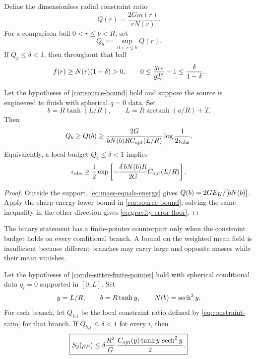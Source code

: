 Define the dimensionless radial constraint ratio
\begin{equation}
 Q(r)=\frac{2Gm(r)}{rN(r)}.
 \label{eq:constraint-ratio}
\end{equation}
For a comparison ball $0<r\leq b<R$, set
\begin{equation}
 Q_b:=\sup_{0<r\leq b}Q(r).
\end{equation}
If $Q_b\leq\delta<1$, then throughout that ball
\begin{equation}
 f(r)\geq N(r)(1-\delta)>0,
 \qquad
 0\leq\frac{g_{rr}}{g_{rr}^{\rm dS}}-1
 \leq\frac{\delta}{1-\delta}.
 \label{eq:metric-control}
\end{equation}

\begin{corollary}
\label{cor:gravity-cost}
Let the hypotheses of \cref{cor:source-bound} hold and suppose the source is
engineered to finish with spherical $q=0$ data.  Set
\begin{equation}
 b=R\tanh(L/R),
 \qquad L=R\operatorname{arctanh}(a/R)+T.
\end{equation}
Then
\begin{equation}
 Q_b\geq Q(b)
 \geq
 \frac{2G}{bN(b)R C_{\rm opt}(L/R)}
 \log\frac{1}{2\epsilon_{\mathrm{obs}}}.
 \label{eq:gravity-lower-bound}
\end{equation}
Equivalently, a local budget $Q_b\leq\delta<1$ implies
\begin{equation}
 \epsilon_{\mathrm{obs}}\geq\frac12\exp\left[
 -\frac{\delta\,bN(b)R}{2G}C_{\rm opt}(L/R)
 \right].
 \label{eq:gravity-error-floor}
\end{equation}
\end{corollary}

\begin{proof}
Outside the support, \cref{eq:mass-equals-energy} gives
$Q(b)=2GE_{K}/[bN(b)]$.  Apply the sharp energy lower bound in
\cref{cor:source-bound}; solving the same inequality in the other direction
gives \cref{eq:gravity-error-floor}.
\end{proof}

The binary statement has a finite-pointer counterpart only when the
constraint budget holds on every conditional branch.  A bound on the weighted
mean field is insufficient because different branches may carry large and
opposite masses while their mean vanishes.

\begin{corollary}
\label{cor:branchwise-gravity-renyi}
Let the hypotheses of \cref{cor:de-sitter-finite-pointer} hold with spherical
conditional data $q_i=0$ supported in $[0,L]$.  Set
\begin{equation}
 y=L/R,
 \qquad b=R\tanh y,
 \qquad N(b)=\operatorname{sech}^2y.
\end{equation}
For each branch, let $Q_{b,i}$ be the local constraint ratio defined by
\cref{eq:constraint-ratio} for that branch.  If
$Q_{b,i}\leq\delta<1$ for every $i$, then
\begin{equation}
 \boxed{
 S_2(\rho_P)\leq
 \delta\frac{R^2}{G}\,
 \frac{C_{\rm opt}(y)\tanh y\,\operatorname{sech}^2y}{2}.}
 \label{eq:branchwise-gravity-renyi}
\end{equation}
\end{corollary}

